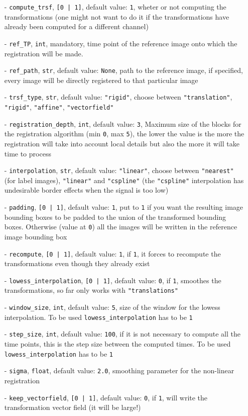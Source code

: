 \documentclass[10pt,a4paper]{article}
\begin{document}
\begin{itemize}
\item[-] \texttt{compute\_trsf}, \texttt{[0 | 1]}, default value: \texttt{1}, wheter or not computing the transformations (one might not want to do it if the transformations have already been computed for a different channel)
\item[-] \texttt{ref\_TP}, \texttt{int}, mandatory, time point of the reference image onto which the registration will be made.
\item[-] \texttt{ref\_path}, \texttt{str}, default value: \texttt{None}, path to the reference image, if specified, every image will be directly registered to that particular image
\item[-] \texttt{trsf\_type}, \texttt{str}, default value: \texttt{"rigid"}, choose between \texttt{"translation"}, \texttt{"rigid"}, \texttt{"affine"}, \texttt{"vectorfield"}
\item[-] \texttt{registration\_depth}, \texttt{int}, default value: \texttt{3}, Maximum size of the blocks for the registration algorithm (min \texttt{0}, max \texttt{5}), the lower the value is the more the registration will take into account local details but also the more it will take time to process
\item[-] \texttt{interpolation}, \texttt{str}, default value: \texttt{"linear"}, choose between \texttt{"nearest"} (for label images), \texttt{"linear"} and \texttt{"cspline"} (the \texttt{"cspline"} interpolation has undesirable border effects when the signal is too low)
\item[-] \texttt{padding}, \texttt{[0 | 1]}, default value: \texttt{1}, put to \texttt{1} if you want the resulting image bounding boxes to be padded to the union of the transformed bounding boxes. Otherwise (value at \texttt{0}) all the images will be written in the reference image bounding box
\item[-] \texttt{recompute}, \texttt{[0 | 1]}, default value: \texttt{1}, if \texttt{1}, it forces to recompute the transformations even though they already exist
\item[-] \texttt{lowess\_interpolation}, \texttt{[0 | 1]}, default value: \texttt{0}, if \texttt{1}, smoothes the transformations, so far only works with \texttt{"translations"}
\item[-] \texttt{window\_size}, \texttt{int}, default value: \texttt{5}, size of the window for the lowess interpolation. To be used \texttt{lowess\_interpolation} has to be \texttt{1}
\item[-] \texttt{step\_size}, \texttt{int}, default value: \texttt{100}, if it is not necessary to compute all the time points, this is the step size between the computed times. To be used \texttt{lowess\_interpolation} has to be \texttt{1}
\item[-] \texttt{sigma}, \texttt{float}, default value: \texttt{2.0}, smoothing parameter for the non-linear registration
\item[-] \texttt{keep\_vectorfield}, \texttt{[0 | 1]}, default value: \texttt{0}, if \texttt{1}, will write the transformation vector field (it will be large!)
\end{itemize}~\\
\end{document}
